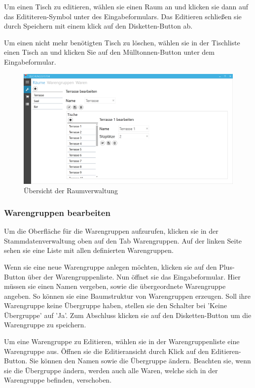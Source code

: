 Um einen Tisch zu editieren, wählen sie einen Raum an und klicken sie dann auf das Edititeren-Symbol unter des Eingabeformulars. Das Editieren schließen sie durch Speichern mit einem klick auf den Disketten-Button ab.

Um einen nicht mehr benötigten Tisch zu löschen, wählen sie in der Tischliste einen Tisch an und klicken Sie auf den Mülltonnen-Button unter dem Eingabeformular.

\begin{figure}[h]
	\begin{center}
		\includegraphics[width=\columnwidth]{Benutzerhandbuch/Raumverwaltung.png}
	\end{center}
	\caption{Übersicht der Raumverwaltung}
	\label{fig:room-management}
\end{figure}

\subsubsection{Warengruppen bearbeiten}

Um die Oberfläche für die Warengruppen aufzurufen, klicken sie in der Stammdatenverwaltung oben auf den Tab Warengruppen. Auf der linken Seite sehen sie eine Liste mit allen definierten Warengruppen. 

Wenn sie eine neue Warengruppe anlegen möchten, klicken sie auf den Plus-Button über der Warengruppenliste. 
Nun öffnet sie das Eingabeformular. Hier müssen sie einen Namen vergeben, sowie die übergeordnete Warengruppe angeben. 
So können sie eine Baumstruktur von Warengruppen erzeugen. 
Soll ihre Warengruppe keine Übergruppe haben, stellen sie den Schalter bei 'Keine Übergruppe' auf 'Ja'. Zum Abschluss klicken sie auf den Disketten-Button um die Warengruppe zu speichern.

Um eine Warengruppe zu Editieren, wählen sie in der Warengruppenliste eine Warengruppe aus. Öffnen sie die Editieransicht durch Klick auf den Editieren-Button.
Sie können den Namen sowie die Übergruppe ändern. Beachten sie, wenn sie die Übergruppe ändern, werden auch alle Waren, welche sich in der Warengruppe befinden, verschoben.

